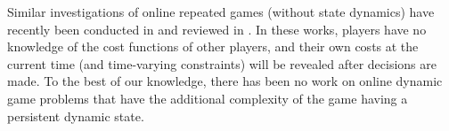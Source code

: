 \documentclass[letterpaper, 10 pt, conference]{ieeeconf}  %
\begin{document}




Similar investigations of online repeated games (without state dynamics) have recently been conducted in \cite{lu_online_2021,meng_decentralized_2022} and reviewed in \cite{li_survey_2023}. In these works, players have no knowledge of the cost functions of other players, and their own costs at the current time (and time-varying constraints) will be revealed after decisions are made. To the best of our knowledge, there has been no work on online dynamic game problems that have the additional complexity of the game having a persistent dynamic state.

\end{document}
